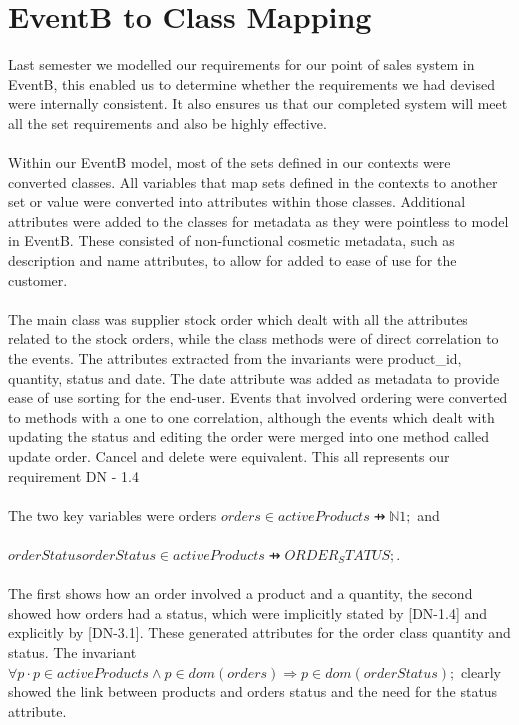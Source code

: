 \documentclass[a4paper]{article}
\begin{document}
\section{EventB to Class Mapping}
Last semester we modelled our requirements for our point of sales system in EventB, this enabled us to determine whether the requirements we had devised were internally consistent. It also ensures us that our completed system will meet all the set requirements and also be highly effective.
\\\\
Within our EventB model, most of the sets defined in our contexts were converted classes. All variables that map sets defined in the contexts to another set or value were converted into attributes within those classes. Additional attributes were added to the classes for metadata as they were pointless to model in EventB. These consisted of non-functional cosmetic metadata, such as description and name attributes, to allow for added to ease of use for the customer.
\\\\
The main class was supplier stock order which dealt with all the attributes related to the stock orders, while the class methods were of direct correlation to the events. The attributes extracted from the invariants were product\_id, quantity, status and date. The date attribute was added as metadata to provide ease of use sorting for the end-user. Events that involved ordering were converted to methods with a one to one correlation, although the events which dealt with updating the status and editing the order were merged into one method called update order. Cancel and delete were equivalent. This all represents our requirement DN - 1.4
\\\\
The two key variables were orders \(orders ∈ activeProducts ⇸ ℕ1;\) and\\\\ \(orderStatus orderStatus ∈ activeProducts ⇸ ORDER_STATUS;\).\\\\
The first shows how an order involved a product and a quantity, the second showed how orders had a status, which were implicitly stated by [DN-1.4] and explicitly by [DN-3.1]. These generated attributes for the order class quantity and status. The invariant \(∀p · p ∈ activeProducts ∧ p ∈ dom(orders) ⇒ p ∈ dom(orderStatus);\) clearly showed the link between products and orders status and the need for the status attribute.
\\\\
\end{document}
